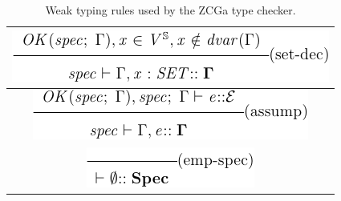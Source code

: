 \begin{table}
\begin{tabular}{|c|}
        \hline
        \includegraphics[scale=0.6]{Figures/zcga/7.png} \\
        \hline
        \includegraphics[scale=0.6]{Figures/zcga/8.png} \\
        \hline
        \includegraphics[scale=0.6]{Figures/zcga/9.png} \\
        \hline
    \end{tabular}
    \caption{Weak typing rules used by the ZCGa type checker. \label{tab:wttrules}}
\end{table}



